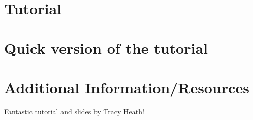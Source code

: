 \documentclass{article}
\begin{document}
\section{Tutorial}
\newcommand{\step}[2]{\addtocounter{stepCounter}{1} {\bf \hypertarget{step\arabic{stepCounter}}{Step \arabic{stepCounter}:}}\xspace #2\par}
\newcommand{\intermediate}[1]{#1}


\newpage
\section{Quick version of the tutorial}
\setcounter{stepCounter}{0}
\renewcommand{\step}[2]{\addtocounter{stepCounter}{1} {\bf \hyperlink{step\arabic{stepCounter}}{Step \arabic{stepCounter}}:}\xspace #1\par}
\renewcommand{\intermediate}[1]{}


\newpage
\section{Additional Information/Resources}
Fantastic
\href{http://treethinkers.org/divergence-time-estimation-using-beast/}{tutorial}
and
\href{https://molevol.mbl.edu/wiki/images/6/6f/Bodega_2013_divtime_lecture.pdf}{slides}
by \href{http://phylo.bio.ku.edu/content/tracy-heath}{Tracy Heath}!

\newpage

\end{document}
